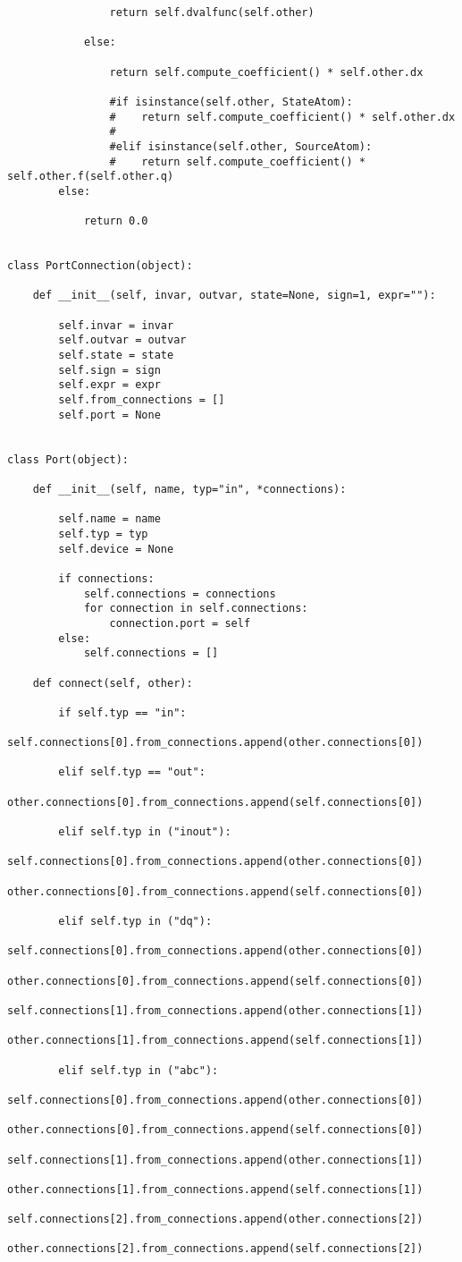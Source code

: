 \begin{lstlisting}
                return self.dvalfunc(self.other)

            else:

                return self.compute_coefficient() * self.other.dx

                #if isinstance(self.other, StateAtom):
                #    return self.compute_coefficient() * self.other.dx
                #
                #elif isinstance(self.other, SourceAtom):
                #    return self.compute_coefficient() * self.other.f(self.other.q)
        else:

            return 0.0


class PortConnection(object):

    def __init__(self, invar, outvar, state=None, sign=1, expr=""):

        self.invar = invar
        self.outvar = outvar
        self.state = state
        self.sign = sign
        self.expr = expr
        self.from_connections = []
        self.port = None


class Port(object):

    def __init__(self, name, typ="in", *connections):

        self.name = name
        self.typ = typ
        self.device = None

        if connections:
            self.connections = connections
            for connection in self.connections:
                connection.port = self
        else:
            self.connections = []

    def connect(self, other):

        if self.typ == "in":
            self.connections[0].from_connections.append(other.connections[0])

        elif self.typ == "out":
            other.connections[0].from_connections.append(self.connections[0])

        elif self.typ in ("inout"):
            self.connections[0].from_connections.append(other.connections[0])
            other.connections[0].from_connections.append(self.connections[0])

        elif self.typ in ("dq"):
            self.connections[0].from_connections.append(other.connections[0])
            other.connections[0].from_connections.append(self.connections[0])
            self.connections[1].from_connections.append(other.connections[1])
            other.connections[1].from_connections.append(self.connections[1])

        elif self.typ in ("abc"):
            self.connections[0].from_connections.append(other.connections[0])
            other.connections[0].from_connections.append(self.connections[0])
            self.connections[1].from_connections.append(other.connections[1])
            other.connections[1].from_connections.append(self.connections[1])
            self.connections[2].from_connections.append(other.connections[2])
            other.connections[2].from_connections.append(self.connections[2])



\end{lstlisting}
